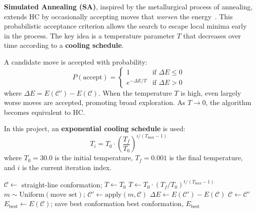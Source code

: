 \textbf{Simulated Annealing (SA)}, inspired by the metallurgical process of annealing, extends HC by occasionally accepting moves that \textit{worsen} the energy~\cite{kirkpatrick1983optimization}. This probabilistic acceptance criterion allows the search to escape local minima early in the process. The key idea is a temperature parameter $T$ that decreases over time according to a \textbf{cooling schedule}.

A candidate move is accepted with probability:
\begin{equation}
    P(\text{accept}) =
    \begin{cases}
        1 & \text{if } \Delta E \leq 0 \\
        e^{-\Delta E / T} & \text{if } \Delta E > 0
    \end{cases}
    \label{eq:sa_accept}
\end{equation}
where $\Delta E = E(\mathcal{C}') - E(\mathcal{C})$. When the temperature $T$ is high, even largely worse moves are accepted, promoting broad exploration. As $T \rightarrow 0$, the algorithm becomes equivalent to HC.

In this project, an \textbf{exponential cooling schedule} is used:
\begin{equation}
    T_i = T_0 \cdot \left(\frac{T_f}{T_0}\right)^{i / (T_{\max} - 1)}
    \label{eq:sa_cooling}
\end{equation}
where $T_0 = 30.0$ is the initial temperature, $T_f = 0.001$ is the final temperature, and $i$ is the current iteration index.

\begin{algorithm}[H]
\caption{Simulated Annealing for HP folding}
\label{alg:sa}
\begin{algorithmic}[1]
\State $\mathcal{C} \leftarrow$ straight-line conformation; $T \leftarrow T_0$
    \State $T \leftarrow T_0 \cdot (T_f / T_0)^{t/(T_{\max}-1)}$  
    \State $m \sim \text{Uniform}(\text{move set})$; $\mathcal{C}' \leftarrow \text{apply}(m, \mathcal{C})$
        \State $\Delta E \leftarrow E(\mathcal{C}') - E(\mathcal{C})$
            \State $\mathcal{C} \leftarrow \mathcal{C}'$
        \EndIf
            \State $E_{\text{best}} \leftarrow E(\mathcal{C})$; save best conformation
        \EndIf
    \EndIf
\EndFor
\State \Return best conformation, $E_{\text{best}}$
\end{algorithmic}
\end{algorithm}

